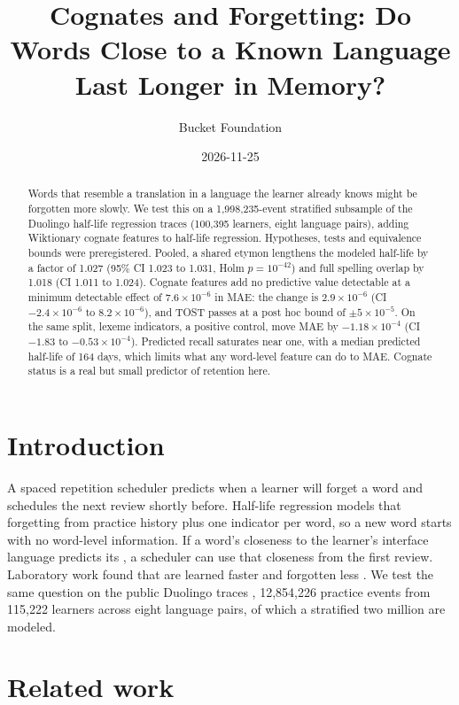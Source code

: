 \documentclass[11pt]{article}
\title{Cognates and Forgetting: Do Words Close to a Known Language Last Longer in Memory?}
\author{Bucket Foundation}
\date{2026-11-25}
\begin{document}
\maketitle

\begin{abstract}
Words that resemble a translation in a language the learner already knows
might be forgotten more slowly. We test this on a 1,998,235-event
stratified subsample of the Duolingo half-life regression traces
(100,395 learners, eight language pairs), adding Wiktionary cognate
features to half-life regression. Hypotheses, tests and equivalence
bounds were preregistered. Pooled, a shared etymon lengthens the modeled
half-life by a factor of 1.027 (95\% CI 1.023 to 1.031, Holm
$p=10^{-42}$) and full spelling overlap by 1.018 (CI 1.011 to 1.024).
Cognate features add no predictive value detectable at a minimum
detectable effect of $7.6\times10^{-6}$ in MAE: the change is
$2.9\times10^{-6}$ (CI $-2.4\times10^{-6}$ to $8.2\times10^{-6}$), and TOST
passes at a post hoc bound of $\pm5\times10^{-5}$. On the same split, lexeme indicators, a
positive control, move MAE by $-1.18\times10^{-4}$ (CI $-1.83$ to
$-0.53\times10^{-4}$). Predicted recall saturates near one, with a median
predicted half-life of 164 days, which limits what any word-level feature can do
to MAE. Cognate status is a real but small predictor of retention here.
\end{abstract}

\section{Introduction}
\label{sec:intro}

A spaced repetition scheduler predicts when a learner will forget a word
and schedules the next review shortly before. Half-life regression
\autocite{settles2016hlr} models that forgetting from practice history
plus one indicator per word, so a new word starts with no word-level
information. If a word's closeness to the learner's interface language
predicts its , a scheduler can use that closeness
from the first review. Laboratory work found that 
are learned faster and forgotten less \autocite{degroot2000hard}. We test
the same question on the public Duolingo traces
\autocite{settles2016data}, 12,854,226 practice events from 115,222
learners across eight language pairs, of which a stratified two million
are modeled.

\section{Related work}
\label{sec:related}
\end{document}
